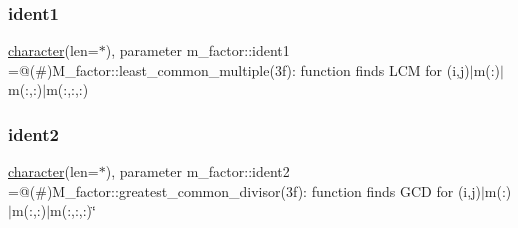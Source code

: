 \subsubsection{\texorpdfstring{ident1}{ident1}}
{\footnotesize\ttfamily \hyperlink{option__stopwatch_83_8txt_abd4b21fbbd175834027b5224bfe97e66}{character}(len=$\ast$), parameter m\+\_\+factor\+::ident1 =\textquotesingle{}@(\#)M\+\_\+factor\+::least\+\_\+common\+\_\+multiple(3f)\+: function finds L\+C\+M for (i,j)$\vert$m(\+:)$\vert$m(\+:,\+:)$\vert$m(\+:,\+:,\+:)\textquotesingle{}\hspace{0.3cm}{\ttfamily [private]}}

\mbox{\label{namespacem__factor_ab34da44c20883bea1b31a67a3d6359e5}} 
\subsubsection{\texorpdfstring{ident2}{ident2}}
{\footnotesize\ttfamily \hyperlink{option__stopwatch_83_8txt_abd4b21fbbd175834027b5224bfe97e66}{character}(len=$\ast$), parameter m\+\_\+factor\+::ident2 =\textquotesingle{}@(\#)M\+\_\+factor\+::greatest\+\_\+common\+\_\+divisor(3f)\+: function finds G\+C\+D for (i,j)$\vert$m(\+:)$\vert$m(\+:,\+:)$\vert$m(\+:,\+:,\+:)\char`\"{}\textquotesingle{}\hspace{0.3cm}{\ttfamily [private]}}

